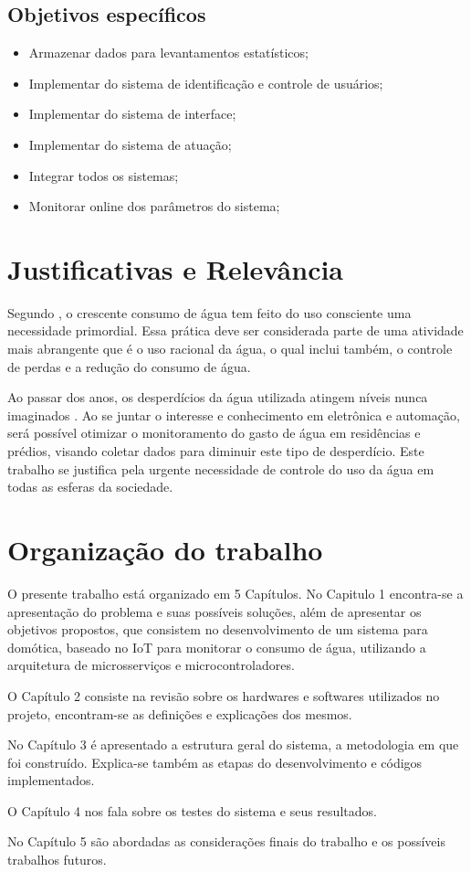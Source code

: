 \subsection{Objetivos específicos}

\begin{itemize}
	\item Armazenar dados para levantamentos estatísticos;
	\item Implementar do sistema de identificação e controle de usuários;
	\item Implementar do sistema de interface;
	\item Implementar do sistema de atuação;
	\item Integrar todos os sistemas;
	\item Monitorar online dos parâmetros do sistema;
\end{itemize}

\section{Justificativas e Relev{\^a}ncia}
%
Segundo \cite{AlvesDaSilva}, o crescente consumo de água
tem feito do uso consciente uma necessidade primordial. Essa prática deve ser considerada parte de uma atividade mais abrangente que é o uso racional da água, o qual inclui também, o controle de perdas e a redução do consumo de água.

Ao passar dos anos, os desperdícios da água utilizada atingem níveis nunca imaginados \cite{rebouccas2003agua}. Ao se juntar o interesse e conhecimento em eletrônica e automação, será possível otimizar o monitoramento do gasto de água em residências e prédios, visando coletar dados para diminuir este tipo de desperdício. Este trabalho se justifica pela urgente necessidade de controle do uso da água em todas as esferas da sociedade. 
%
\section{Organização do trabalho}

O presente trabalho está organizado em 5 Capítulos. No Capitulo 1 encontra-se a apresentação do problema e suas possíveis soluções, além de apresentar os objetivos propostos, que consistem no desenvolvimento de um sistema para domótica, baseado no IoT para monitorar o consumo de água, utilizando a arquitetura de microsserviços e microcontroladores.

O Capítulo 2 consiste na revisão sobre os hardwares e softwares utilizados no projeto, encontram-se as definições e explicações dos mesmos.

No Capítulo 3 é apresentado a estrutura geral do sistema, a metodologia em que foi construído. Explica-se também as etapas do desenvolvimento e códigos implementados.

O Capítulo 4 nos fala sobre os testes do sistema e seus resultados.

No Capítulo 5 são abordadas as considerações finais do trabalho e os possíveis trabalhos futuros.